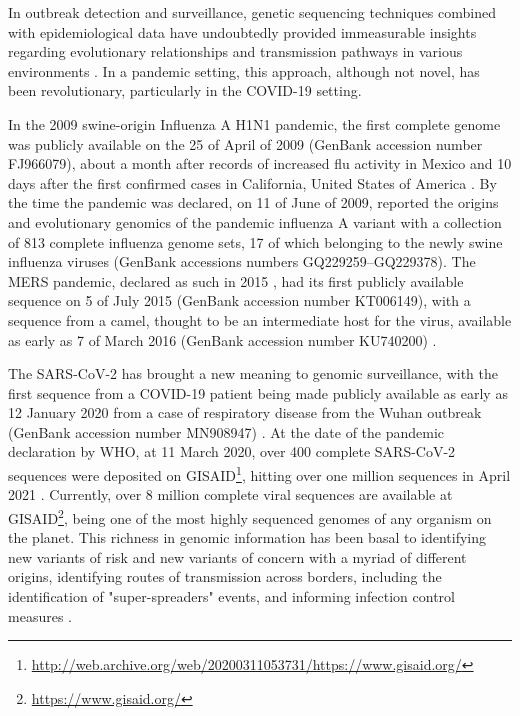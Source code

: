 In outbreak detection and surveillance, genetic sequencing techniques combined with epidemiological data have undoubtedly provided immeasurable insights regarding evolutionary relationships and transmission pathways in various environments \citep{beckett_pandemic_2021, lancet_genomic_2021}. In a pandemic setting, this approach, although not novel, has been revolutionary, particularly in the COVID-19 setting. 

In the 2009 swine-origin Influenza A H1N1 pandemic, the first complete genome was publicly available on the 25 of April of 2009 (GenBank accession number FJ966079), about a month after records of increased flu activity in Mexico and 10 days after the first confirmed cases in California, United States of America \citep{smith_origins_2009, novel_swine-origin_influenza_a_h1n1_virus_investigation_team_emergence_2009}. By the time the pandemic was declared, on 11 of June of 2009, \cite{smith_origins_2009} reported the origins and evolutionary genomics of the pandemic influenza A variant with a collection of 813 complete influenza genome sets, 17 of which belonging to the newly swine influenza viruses (GenBank accessions numbers GQ229259–GQ229378). The MERS pandemic, declared as such in 2015 \citep{piret_pandemics_2021}, had its first publicly available sequence on 5 of July 2015 (GenBank accession number KT006149)\citep{lu_complete_2015}, with a sequence from a camel, thought to be an intermediate host for the virus, available as early as 7 of March 2016 (GenBank accession number KU740200) \citep{kandeil_complete_2016, al-shomrani_genomic_2020}. 

The SARS-CoV-2 has brought a new meaning to genomic surveillance, with the first sequence from a COVID-19 patient being made publicly available as early as 12 January 2020 from a case of respiratory disease from the Wuhan outbreak (GenBank accession number MN908947) \citep{wu_new_2020}. At the date of the pandemic declaration by WHO, at 11 March 2020, over 400 complete SARS-CoV-2 sequences were deposited on GISAID\footnote{\url{http://web.archive.org/web/20200311053731/https://www.gisaid.org/}}, hitting over one million sequences in April 2021 \citep{maxmen_one_2021}. Currently, over 8 million complete viral sequences are available at GISAID\footnote{\url{https://www.gisaid.org/}}, being one of the most highly sequenced genomes of any organism on the planet. This richness in genomic information has been basal to identifying new variants of risk and new variants of concern with a myriad of different origins, identifying routes of transmission across borders, including the identification of "super-spreaders" events, and informing infection control measures \citep{lancet_genomic_2021, beckett_pandemic_2021, borges_sars-cov-2_2022}.  

